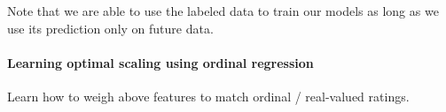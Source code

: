 Note that we are able to use the labeled data to train our models as long as we use its prediction only on future data. 

\paragraph{Learning optimal scaling using ordinal regression}
Learn how to weigh above features to match ordinal / real-valued ratings.
